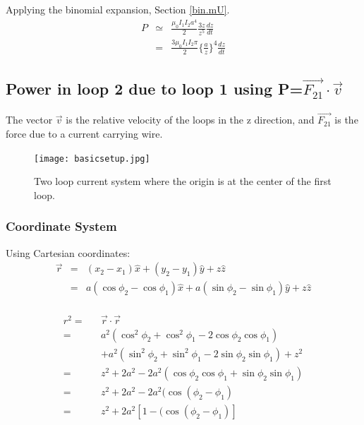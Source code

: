 \documentclass[12pt]{revtex4}
\begin{document}
Applying the binomial expansion, Section \ref{bin.mU}.                                                                                                                             
\begin{eqnarray}
P&\simeq&\frac{\mu_{0}I_1 I_2a^4}{2} \frac{3 z }{z^5}  \frac{dz}{dt}\\ \nonumber
&=& \frac{3\mu_{0} I_{1}I_{2}\pi}{2} \Big\{\frac{a}{z}\Big\}^{4}\frac{dz}{dt}
\end{eqnarray}

    
\newpage
\subsection{Power in loop 2  due to loop 1 using P=$\vec{F_{21}} \cdot \vec{v}$}
The vector $\vec{v}$ is the relative velocity of the loops in the z direction,  and $\vec{F_{21}} $ is the force due to a current carrying wire. 

\begin{figure}[h]
\begin{center}
\texttt{[image: basicsetup.jpg]} 
\end{center}
\caption{\label{fig:2loop} Two loop current system where the origin is at the center of the first loop.}
\end{figure}      

\subsubsection{Coordinate System}
Using Cartesian coordinates:
\begin{eqnarray*}
\vec{r}&=&(x_{2}-x_{1})\hat{x}+(y_{2}-y_{1})\hat{y}+z\hat{z}\\
&=&a(\cos\phi_{2}-\cos\phi_{1})\hat{x}+a(\sin\phi_{2}-\sin\phi_{1})\hat{y}+z\hat{z}\\
\end{eqnarray*}

\begin{eqnarray*}
r^{2}=&&\vec{r} \cdot \vec{r}\\
=&&a^{2}(\cos^{2}\phi_{2} +\cos^{2}\phi_{1}-2\cos\phi_{2}\cos\phi_{1})\\
 &&+a^{2}(\sin^{2}\phi_{2}+\sin^{2}\phi_{1}-2\sin\phi_{2}\sin\phi_{1})+z^{2}\\
 =&&z^{2}+2a^{2}-2a^{2}(\cos\phi_{2}\cos\phi_{1}+\sin\phi_{2}\sin\phi_{1})\\
  =&&z^{2}+2a^{2}-2a^{2}(\cos(\phi_{2}-\phi_{1})\\
  =&&z^{2}+2a^{2}[1-(\cos(\phi_{2}-\phi_{1})]
\end{eqnarray*}
\end{document}
